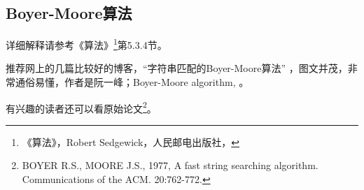 \subsection{Boyer-Moore算法}
详细解释请参考《算法》\footnote{《算法》，Robert 
Sedgewick，人民邮电出版社，}第5.3.4节。

推荐网上的几篇比较好的博客，“字符串匹配的Boyer-Moore算法” 
，图文并茂，非常通俗易懂，作者是阮一峰；Boyer-Moore
 algorithm, 。

有兴趣的读者还可以看原始论文\footnote{BOYER R.S., MOORE J.S., 1977, A fast string 
searching algorithm. Communications of the ACM. 20:762-772.}。

